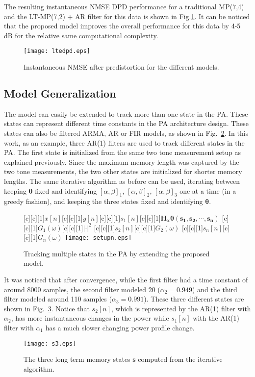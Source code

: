 \documentclass[journal]{IEEEtran}
\begin{document}
The resulting instantaneous NMSE DPD performance for a traditional MP(7,4) and the LT-MP(7,2) + AR filter for 
this data is shown in Fig.\ref{ltedpd}. It can be noticed that the proposed model improves the overall performance
for this data by 4-5 dB for the relative same computational complexity.

\begin{figure}
\centering
\texttt{[image: ltedpd.eps]}
\caption{Instantaneous NMSE after predistortion for the different models.} \label{ltedpd}
\end{figure}

\subsection{Model Generalization}
The model can easily be extended to track more than one state in the PA. These states can represent different time constants in the PA architecture design. These states can also be filtered ARMA, AR or FIR models, as shown in Fig.~\ref{setup2}. In this work, as an example, three AR(1) filters are used to track different states in the PA. The first state is initialized from the same two tone measurement setup as explained previously. Since the maximum memory length was captured by the two tone measurements, the two other states are initialized for shorter memory lengths. The same iterative algorithm as before can be used, iterating between keeping $\bm{\theta}$ fixed and identifying $[\alpha,\beta]_1$, $[\alpha,\beta]_2$, $[\alpha,\beta]_3$ one at a time (in a greedy fashion), and keeping the three states fixed and identifying $\bm{\theta}$. \begin{figure}
\centering
{}[c][c][1]{$x[n]$}[c][c][1]{$y[n]$}[c][c][1]{$s_1[n]$}[c][c][1]{$\mathbf{H_x }\bm{\theta}\mathbf{(s_1,s_2,\cdots,s_n)}$}
[c][c][1]{$G_1\left(\omega\right)$}[c][c][1]{$|\cdot|^2$}
[c][c][1]{$s_2[n]$}[c][c][1]{$G_2\left(\omega\right)$}
[c][c][1]{$s_n[n]$}[c][c][1]{$G_n\left(\omega\right)$}
\texttt{[image: setupn.eps]}
\caption{Tracking multiple states in the PA by extending the proposed model.} \label{setup2}
\end{figure}



It was noticed that after convergence, while the first filter had a time constant of around 8000 samples, the second filter modeled 20 ($\alpha_2 = 0.949$) and the third filter modeled around 110 samples ($\alpha_3 = 0.991$). These three different states are shown in Fig.~\ref{s3}. Notice that $s_2[n]$, which is represented by the AR(1) filter with $\alpha_2$, has more instantaneous changes in the power while $s_1[n]$ with the AR(1) filter with $\alpha_1$ has a much slower changing power profile change.
\begin{figure}
\centering
\texttt{[image: s3.eps]}
\caption{The three long term memory states $\bm{s}$ computed from the iterative algorithm.} \label{s3}
\end{figure}
\end{document}
